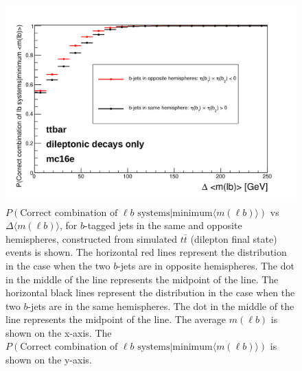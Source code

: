 \begin{figure}[h!]
	\includegraphics[width=0.6\linewidth]{figures/lbassoc_2vSM.png}
	\centering
	\caption{$P(\text{Correct combination of } \ell b \text{ systems} | \text{minimum} \langle m(\ell b) \rangle)$ vs $\Delta \langle m(\ell b) \rangle$, for $b$-tagged jets in the same and opposite hemispheres, constructed from simulated $t\bar{t}$ (dilepton final state) events is shown. The horizontal red lines represent the distribution in the case when the two $b$-jets are in opposite hemispheres. The dot in the middle of the line represents the midpoint of the line. The horizontal black lines represent the distribution in the case when the two $b$-jets are in the same hemispheres. The dot in the middle of the line represents the midpoint of the line. The average $m(\ell b)$ is shown on the x-axis. The $P(\text{Correct combination of } \ell b \text{ systems} | \text{minimum} \langle m(\ell b) \rangle)$ is shown on the y-axis.}
	\label{fig:lb-assoc}

\end{figure}
